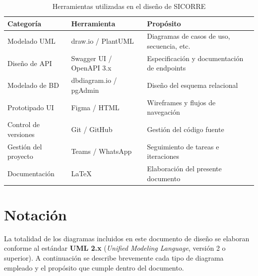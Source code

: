 \begin{table}[h!]
	\centering
	\caption{Herramientas utilizadas en el diseño de SICORRE}
	\begin{tabular}{|p{3.5cm}|p{4cm}|p{6.5cm}|}
		\hline
		\textbf{Categoría}        & \textbf{Herramienta}          & \textbf{Propósito}                          \\ \hline
		Modelado UML              & draw.io / PlantUML            & Diagramas de casos de uso, secuencia, etc.  \\ \hline
		Diseño de API             & Swagger UI / OpenAPI 3.x      & Especificación y documentación de endpoints \\ \hline
		Modelado de BD            & dbdiagram.io / pgAdmin        & Diseño del esquema relacional               \\ \hline
		Prototipado UI            & Figma / HTML 				  & Wireframes y flujos de navegación           \\ \hline
		Control de versiones      & Git / GitHub                  & Gestión del código fuente                   \\ \hline
		Gestión del proyecto      & Teams / WhatsApp              & Seguimiento de tareas e iteraciones         \\ \hline
		Documentación             & \LaTeX                        & Elaboración del presente documento          \\ \hline
	\end{tabular}
	\label{tab:herramientas}
\end{table}

\section{Notación}

La totalidad de los diagramas incluidos en este documento de diseño se elaboran conforme
al estándar \textbf{UML 2.x} (\textit{Unified Modeling Language}, versión 2 o superior). A continuación se describe
brevemente cada tipo de diagrama empleado y el propósito que cumple dentro del documento.

